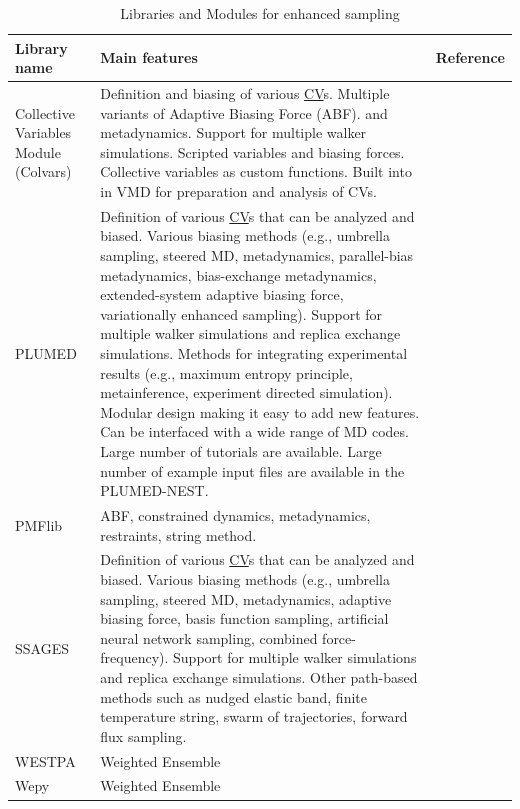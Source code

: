 \documentclass[9pt,review]{livecoms}
\providecommand{\DIFaddtex}[1]{{\protect\color{blue}\uwave{#1}}} %
\providecommand{\DIFaddFL}[1]{\DIFadd{#1}} %
\providecommand{\DIFaddbeginFL}{} %
\providecommand{\DIFaddendFL}{} %
\providecommand{\DIFadd}[1]{\texorpdfstring{\DIFaddtex{#1}}{#1}} %
\newcommand{\DIFaddincludegraphics}[2][]{{\color{blue}\fbox{\DIFOincludegraphics[#1]{#2}}}} %
\DeclareRobustCommand{\DIFaddbeginFL}{\DIFOaddbeginFL \let\includegraphics\DIFaddincludegraphics} %
\DeclareRobustCommand{\DIFaddendFL}{\DIFOaddendFL \let\includegraphics\DIFOincludegraphics} %
\begin{document}
\begin{table}[!ht]
\caption {Libraries and Modules for enhanced sampling}
\label{Table:Libraries}
\begin{tabularx}{0.95\textwidth}{
  || >{\raggedright\arraybackslash}l
  || >{\raggedright\arraybackslash}X
  | >{\raggedright\arraybackslash}l ||}
\hline
  Library name  & Main features                         & Reference \\
\hline
\hline
  Collective Variables Module (Colvars) & Definition and biasing of various \hyperlink{ref:CV} {CV}s.
  Multiple variants of Adaptive Biasing Force (ABF). and metadynamics. Support for multiple walker simulations. Scripted variables and biasing forces. Collective variables as custom functions.
  Built into in VMD for preparation and analysis of CVs. & \cite{Fiorin2013, Henin2022dashboard}\\
\hline
PLUMED        &  Definition of various \hyperlink{ref:CV} {CV}s that can be analyzed and biased. Various biasing methods (e.g., umbrella sampling, steered MD, metadynamics, parallel-bias metadynamics, bias-exchange metadynamics, extended-system adaptive biasing force, variationally enhanced sampling). Support for multiple walker simulations and replica exchange simulations. Methods for integrating experimental results (e.g., maximum entropy principle, metainference, experiment directed simulation). Modular design making it easy to add new features. Can be interfaced with a wide range of MD codes. Large number of tutorials are available\DIFaddbeginFL \DIFaddFL{~\mbox{%
\cite{plumed_masterclass}}\hspace{0pt}%
}\DIFaddendFL . Large number of example input files are available in the PLUMED-NEST\DIFaddbeginFL \DIFaddFL{~\mbox{%
\cite{plumed_nest_url}}\hspace{0pt}%
}\DIFaddendFL .         &  \cite{Bonomi-CPC-2009,Tribello2014,plumed-nest} \\
\hline
PMFlib        &  ABF, constrained dynamics, metadynamics, restraints, string method. &  \cite{kulhanek2011pmflib} \\
\hline
SSAGES & Definition of various \hyperlink{ref:CV} {CV}s that can be analyzed and biased. Various biasing methods (e.g., umbrella sampling, steered MD, metadynamics, adaptive biasing force, basis function sampling, artificial neural network sampling, combined force-frequency). Support for multiple walker simulations and replica exchange simulations. Other path-based methods such as nudged elastic band, finite temperature string, swarm of trajectories, forward flux sampling. & \cite{Sidky2018} \\
\hline
WESTPA        &   Weighted Ensemble     & \cite{Bogetti2019Suite, Russo_2022}  \\
\hline
Wepy          &  Weighted Ensemble  & \cite{samuel_d_lotz_2020_4270219} \\
\hline
\end{tabularx}
\end{table}
\end{document}
